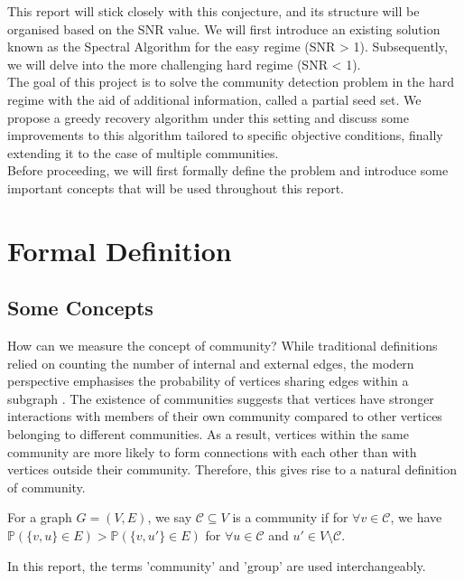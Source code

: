 This report will stick closely with this conjecture, and its structure will be organised based on the SNR value. We will first introduce an existing solution known as the Spectral Algorithm for the easy regime (SNR > 1). Subsequently, we will delve into the more challenging hard regime (SNR < 1).\\
The goal of this project is to solve the community detection problem in the hard regime with the aid of additional information, called a partial seed set. We propose a greedy recovery algorithm under this setting and discuss some improvements to this algorithm tailored to specific objective conditions, finally extending it to the case of multiple communities.\\

Before proceeding, we will first formally define the problem and introduce some important concepts that will be used throughout this report.

\section{Formal Definition}
\subsection{Some Concepts}
How can we measure the concept of community?  While traditional definitions relied on counting the number of internal and external edges, the modern perspective emphasises the probability of vertices sharing edges within a subgraph \cite{userguide}. The existence of communities suggests that vertices have stronger interactions with members of their own community compared to other vertices belonging to different communities. As a result, vertices within the same community are more likely to form connections with each other than with vertices outside their community. Therefore, this gives rise to a natural definition of community.
\begin{definition}
   For a graph $G=(V,E)$, we say $\mathcal{C}\subseteq V$ is a community if for $\forall v\in \mathcal{C}$, we have $\mathbb{P}\left(\{v,u\}\in E\right)>\mathbb{P}\left(\{v,u'\}\in E\right)$ for $\forall u\in \mathcal{C}$ and $u'\in V\setminus \mathcal{C}$.
\end{definition}
\begin{remark}
    In this report, the terms 'community' and 'group' are used interchangeably.
\end{remark}

